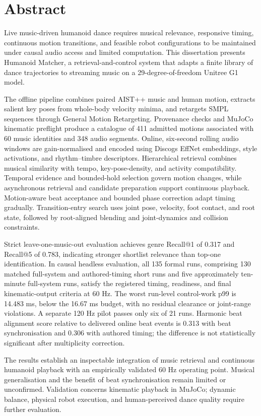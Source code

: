 
\chapter*{Abstract}

Live music-driven humanoid dance requires musical relevance, responsive timing,
continuous motion transitions, and feasible robot configurations to be maintained
under causal audio access and limited computation. This dissertation presents
Humanoid Matcher, a retrieval-and-control system that adapts a finite library of
dance trajectories to streaming music on a 29-degree-of-freedom Unitree G1 model.

The offline pipeline combines paired AIST++ music and human motion, extracts
salient key poses from whole-body velocity minima, and retargets SMPL sequences
through General Motion Retargeting. Provenance checks and MuJoCo kinematic
preflight produce a catalogue of 411 admitted motions associated with 60 music
identities and 348 audio segments. Online, six-second rolling audio windows are
gain-normalised and encoded using Discogs EffNet embeddings, style activations,
and rhythm--timbre descriptors. Hierarchical retrieval combines musical similarity
with tempo, key-pose-density, and activity compatibility. Temporal evidence and
bounded-hold selection govern motion changes, while asynchronous retrieval and
candidate preparation support continuous playback. Motion-aware beat acceptance
and bounded phase correction adapt timing gradually. Transition-entry search
uses joint pose, velocity, foot contact, and root state, followed by root-aligned
blending and joint-dynamics and collision constraints.

Strict leave-one-music-out evaluation achieves genre Recall@1 of 0.317 and
Recall@5 of 0.783, indicating stronger shortlist relevance than top-one
identification. In causal headless evaluation, all 135 formal runs, comprising
130 matched full-system and authored-timing short runs and five approximately
ten-minute full-system runs, satisfy the registered timing, readiness, and final
kinematic-output criteria at 60 Hz. The worst run-level control-work p99 is
14.483 ms, below the 16.67 ms budget, with no residual clearance or joint-range
violations. A separate 120 Hz pilot passes only six of 21 runs. Harmonic beat
alignment score relative to delivered online beat events is 0.313 with beat
synchronisation and 0.306 with authored timing; the difference is not
statistically significant after multiplicity correction.

The results establish an inspectable integration of music retrieval and
continuous humanoid playback with an empirically validated 60 Hz operating
point. Musical generalisation and the benefit of beat synchronisation remain
limited or unconfirmed. Validation concerns kinematic playback in MuJoCo;
dynamic balance, physical robot execution, and human-perceived dance quality
require further evaluation.

